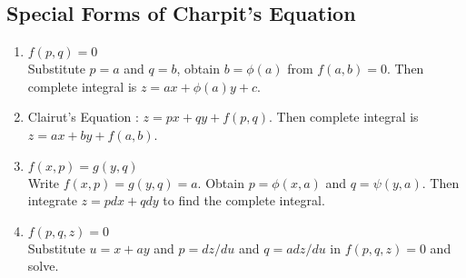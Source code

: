 \subsection{Special Forms of Charpit's Equation}
\begin{enumerate}
	\item $f(p,q) = 0$ \\
	Substitute $p = a$ and $q = b$, obtain $b = \phi(a)$ from $f(a,b) = 0$. Then complete integral is $z = ax + \phi(a)y + c$.
	\item Clairut's Equation : $z = px + qy + f(p,q)$. Then complete integral is $z = ax + by + f(a,b)$.
	\item $f(x,p) = g(y,q)$\\
	Write $f(x,p) = g(y,q) = a$. Obtain $p = \phi(x,a)$ and $q = \psi(y,a)$. Then integrate $z = pdx + qdy$ to find the complete integral.
	\item $f(p,q,z) = 0$ \\
	Substitute $u = x+ay$ and $p = dz/du$ and $q = adz/du$ in $f(p,q,z) = 0$ and solve.
\end{enumerate}

